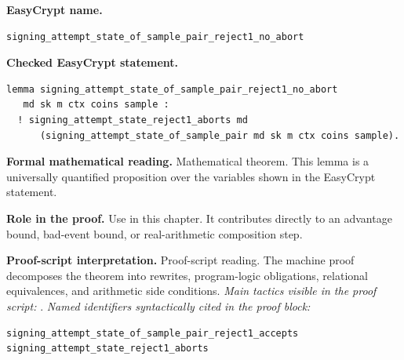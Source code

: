 \begin{formaltheorem}
\noindent\textbf{EasyCrypt name.}
\begin{lstlisting}[language=EasyCrypt,basicstyle=\ttfamily\scriptsize]
signing_attempt_state_of_sample_pair_reject1_no_abort
\end{lstlisting}
\noindent\textbf{Checked EasyCrypt statement.}
\begin{lstlisting}[language=EasyCrypt,basicstyle=\ttfamily\scriptsize]
lemma signing_attempt_state_of_sample_pair_reject1_no_abort
   md sk m ctx coins sample :
  ! signing_attempt_state_reject1_aborts md
      (signing_attempt_state_of_sample_pair md sk m ctx coins sample).
\end{lstlisting}
\noindent\textbf{Formal mathematical reading.}
Mathematical theorem. This lemma is a universally quantified proposition over the variables shown in the EasyCrypt statement.

\noindent\textbf{Role in the proof.}
Use in this chapter. It contributes directly to an advantage bound, bad-event bound, or real-arithmetic composition step.

\noindent\textbf{Proof-script interpretation.}
Proof-script reading. The machine proof decomposes the theorem into rewrites, program-logic obligations, relational equivalences, and arithmetic side conditions.
\emph{Main tactics visible in the proof script:} .
\emph{Named identifiers syntactically cited in the proof block:}
\begin{lstlisting}[language=EasyCrypt,basicstyle=\ttfamily\scriptsize]
signing_attempt_state_of_sample_pair_reject1_accepts
signing_attempt_state_reject1_aborts
\end{lstlisting}

\end{formaltheorem}

